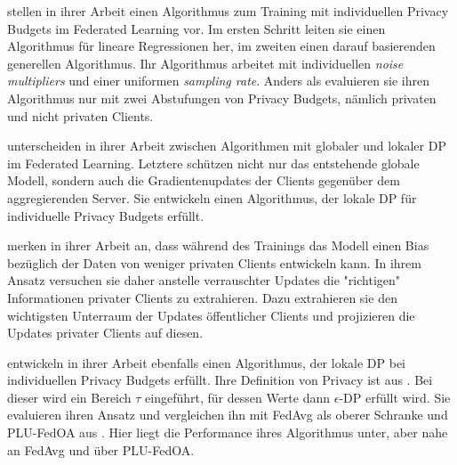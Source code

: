 \textcite{aldaghri:2023} stellen in ihrer Arbeit einen Algorithmus zum Training mit individuellen Privacy Budgets im Federated Learning vor. Im ersten Schritt leiten sie einen Algorithmus für lineare Regressionen her, im zweiten einen darauf basierenden generellen Algorithmus. Ihr Algorithmus arbeitet mit individuellen \textit{noise multipliers} und einer uniformen \textit{sampling rate}. Anders als \citeauthor{boenisch:2023} evaluieren sie ihren Algorithmus nur mit zwei Abstufungen von Privacy Budgets, nämlich privaten und nicht privaten Clients.

\textcite{yang:2021} unterscheiden in ihrer Arbeit zwischen Algorithmen mit globaler und lokaler DP im Federated Learning. Letztere schützen nicht nur das entstehende globale Modell, sondern auch die Gradientenupdates der Clients gegenüber dem aggregierenden Server. Sie entwickeln einen Algorithmus, der lokale DP für individuelle Privacy Budgets erfüllt.

\textcite{liu:2021} merken in ihrer Arbeit an, dass während des Trainings das Modell einen Bias bezüglich der Daten von weniger privaten Clients entwickeln kann. In ihrem Ansatz versuchen sie daher anstelle verrauschter Updates die "richtigen" Informationen privater Clients zu extrahieren. Dazu extrahieren sie den wichtigsten Unterraum der Updates öffentlicher Clients und projizieren die Updates privater Clients auf diesen.

\textcite{shen:2023} entwickeln in ihrer Arbeit ebenfalls einen Algorithmus, der lokale DP bei individuellen Privacy Budgets erfüllt. Ihre Definition von Privacy ist aus \textcite{chen:2016}. Bei dieser wird ein Bereich $\tau$ eingeführt, für dessen Werte dann $\epsilon$-DP erfüllt wird. Sie evaluieren ihren Ansatz und vergleichen ihn mit FedAvg \parencite{mcmahan:2016} als oberer Schranke und PLU-FedOA aus \textcite{yang:2021}. Hier liegt die Performance ihres Algorithmus unter, aber nahe an FedAvg und über PLU-FedOA. 

